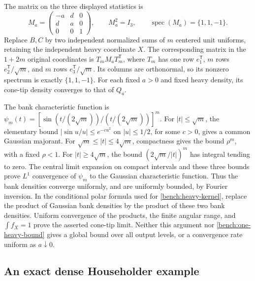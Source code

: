 \begin{remark}
The matrix on the three displayed statistics is
\[
 M_a=\begin{pmatrix}-a&d&0\\d&a&0\\0&0&1\end{pmatrix},
 \qquad M_a^2=I_3,\qquad \operatorname{spec}(M_a)=\{1,1,-1\}.
\]
Replace \(B,C\) by two independent normalized sums of \(m\)
centered unit uniforms, retaining the independent heavy coordinate
\(X\).  The corresponding matrix in the \(1+2m\) original
coordinates is \(T_mM_aT_m^{\mathsf T}\), where \(T_m\) has one
row \(e_1^{\mathsf T}\), \(m\) rows \(e_2^{\mathsf T}/\sqrt m\),
and \(m\) rows \(e_3^{\mathsf T}/\sqrt m\).  Its columns are
orthonormal, so its nonzero spectrum is exactly \(\{1,1,-1\}\).
For each fixed \(a>0\) and fixed heavy density, its cone-tip density
converges to that of \(Q_a\).

The bank characteristic function is
\(\psi_m(t)=[\sin(t/(2\sqrt m))/(t/(2\sqrt m))]^m\).
For \(|t|\leq\sqrt m\), the elementary bound
\(|\sin u/u|\leq e^{-c u^2}\) on \(|u|\leq1/2\), for some
\(c>0\), gives a common Gaussian majorant.  For
\(\sqrt m\leq|t|\leq4\sqrt m\), compactness gives the bound
\(\rho^m\), with a fixed \(\rho<1\).  For
\(|t|\geq4\sqrt m\), the bound
\((2\sqrt m/|t|)^m\) has integral tending to zero.  The central
limit expansion on compact intervals and these three bounds prove
\(L^1\) convergence of \(\psi_m\) to the Gaussian characteristic
function.  Thus the bank densities converge uniformly, and are
uniformly bounded, by Fourier inversion.  In the conditional polar
formula used for \eqref{bench:heavy-kernel}, replace the product of
Gaussian bank densities by the product of these two bank densities.
Uniform convergence of the products, the finite angular range, and
\(\int f_X=1\) prove the asserted cone-tip limit.
Neither this argument nor \eqref{bench:one-heavy-bound} gives a
global bound over all output levels, or a convergence rate uniform
as \(a\downarrow0\).
\end{remark}

\subsection{An exact dense Householder example}

